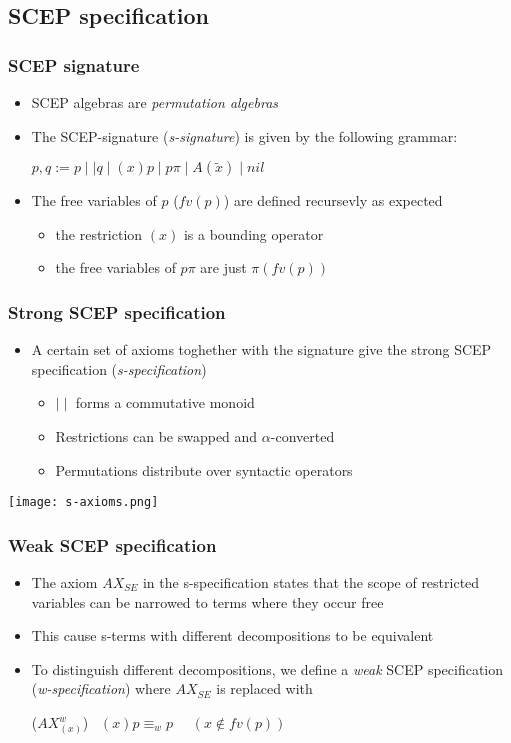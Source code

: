 \documentclass{beamer}
\begin{document}
\subsection{SCEP specification}
\begin{frame}
\frametitle{SCEP signature}
\begin{itemize}
	\item SCEP algebras are \emph{permutation algebras}
\medskip
	\item The SCEP-signature (\emph{s-signature}) is given by the following grammar:
	\begin{center}
		$p,q := p \mid \mid q \mid (x)p \mid p \pi \mid A(\widetilde{x}) \mid nil$
	\end{center}
\medskip
	\item The free variables of $p$ ($fv(p)$) are defined recursevly as expected
	\begin{itemize}
		\item the restriction $(x)$ is a bounding operator
		\item the free variables of $p \pi$ are just $\pi (fv(p))$
	\end{itemize}
\end{itemize}
\end{frame}

\begin{frame}
\frametitle{Strong SCEP specification}
\begin{itemize}
	\item A certain set of axioms toghether with the signature give the strong SCEP specification
	(\emph{s-specification})
	\begin{itemize}
		\item $\mid \mid$ forms a commutative monoid
		\item Restrictions can be swapped and $\alpha$-converted
		\item Permutations distribute over syntactic operators
	\end{itemize}		
\end{itemize}
\begin{center}
	\texttt{[image: s-axioms.png]}      
\end{center}
\end{frame}

\begin{frame}
\frametitle{Weak SCEP specification}
\begin{itemize}
	\item The axiom $AX_{SE}$ in the s-specification states that the scope of restricted
	variables can be narrowed to terms where they occur free
\medskip
	\item This cause s-terms with different decompositions to be equivalent
\medskip
	\item To distinguish different decompositions, we define a \emph{weak} SCEP specification
	(\emph{w-specification}) where $AX_{SE}$ is replaced with
	\begin{center}
		($AX_{(x)}^w$) \ $(x)p \equiv_w p$ \ \ $(x \not \in fv(p))$
	\end{center}
\end{itemize}
\end{frame}
\end{document}
